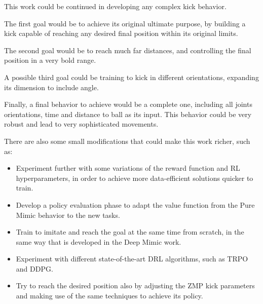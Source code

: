 This work could be continued in developing any complex kick behavior.

The first goal would be to achieve its original ultimate purpose, by building a kick capable of reaching any desired final position within its original limits.

The second goal would be to reach much far distances, and controlling the final position in a very bold range.

A possible third goal could be training to kick in different orientations, expanding its dimension to include angle.

Finally, a final behavior to achieve would be a complete one, including all joints orientations, time and distance to ball as its input. This behavior could be very robust and lead to very sophisticated movements.

There are also some small modifications that could make this work richer, such as:

\begin{itemize}
\item Experiment further with some variations of the reward function and RL hyperparameters, in order to achieve more data-efficient solutions quicker to train.

\item Develop a policy evaluation phase to adapt the value function from the Pure Mimic behavior to the new tasks.

\item Train to imitate and reach the goal at the same time from scratch, in the same way that is developed in the Deep Mimic work.

\item Experiment with different state-of-the-art DRL algorithms, such as TRPO and DDPG.

\item Try to reach the desired position also by adjusting the ZMP kick parameters and making use of the same techniques to achieve its policy.
\end{itemize}


